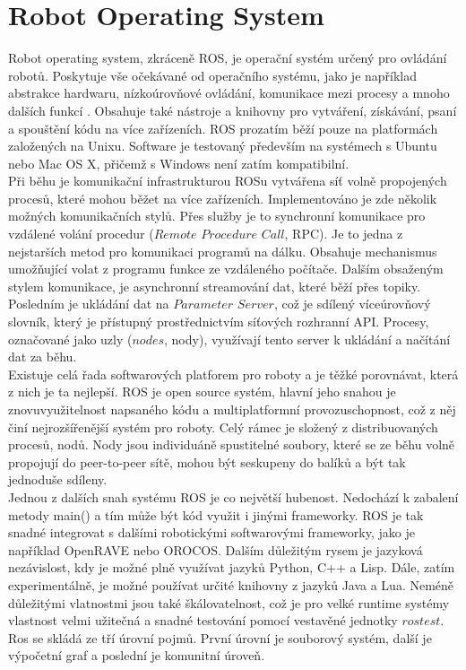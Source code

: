\documentclass[12pt]{report}
\begin{document}
\section{Robot Operating System}
Robot operating system, zkráceně ROS, je operační systém určený pro ovládání robotů. Poskytuje vše očekávané od operačního systému, jako je například abstrakce hardwaru, nízkoúrovňové ovládání, komunikace mezi procesy a mnoho dalších funkcí \cite{Ros}. Obsahuje také nástroje a knihovny pro vytváření, získávání, psaní a spouštění kódu na více zařízeních. ROS prozatím běží pouze na platformách založených na Unixu. Software je testovaný především na systémech s Ubuntu nebo Mac OS X, přičemž s Windows není zatím kompatibilní. \\
\indent Při běhu je komunikační infrastrukturou ROSu vytvářena síť volně propojených procesů, které mohou běžet na více zařízeních. Implementováno je zde několik možných komunikačních stylů. Přes služby je to synchronní komunikace pro vzdálené volání procedur ($Remote$ $Procedure$ $Call$, RPC). Je to jedna z nejstarších metod pro komunikaci programů na dálku. Obsahuje mechanismus umožňující volat z programu funkce ze vzdáleného počítače. Dalším obsaženým stylem komunikace, je asynchronní streamování dat, které běží přes topiky. Posledním je ukládání dat na $Parameter$ $Server$, což je sdílený víceúrovňový slovník, který je přístupný prostřednictvím síťových rozhranní API. Procesy, označované jako uzly ($nodes$, nody), využívají tento server k ukládání a načítání dat za běhu.\\
\indent Existuje celá řada softwarových platforem pro roboty a je těžké porovnávat, která z nich je ta nejlepší. ROS je open source systém, hlavní jeho snahou je znovuvyužitelnost napsaného kódu a multiplatformní provozuschopnost, což z něj činí nejrozšířenější systém pro roboty. Celý rámec je složený z distribuovaných procesů, nodů. Nody jsou individuáně spustitelné soubory, které se ze běhu volně propojují do peer-to-peer sítě, mohou být seskupeny do balíků a být tak jednoduše sdíleny.\\
\indent Jednou z dalších snah systému ROS je co největší hubenost. Nedochází k zabalení metody main() a tím může být kód využit i jinými frameworky. ROS je tak snadné integrovat s dalšími robotickými softwarovými frameworky, jako je například OpenRAVE nebo OROCOS. Dalším důležitým rysem je jazyková nezávislost, kdy je možné plně využívat jazyků Python, C++ a Lisp. Dále, zatím experimentálně, je možné používat určité knihovny z jazyků Java a Lua. Neméně důležitými vlatnostmi jsou také škálovatelnost, což je pro velké runtime systémy vlastnost velmi užitečná a snadné testování pomocí vestavěné jednotky $rostest$.\\
\indent Ros se skládá ze tří úrovní pojmů. První úrovní je souborový systém, další je výpočetní graf a poslední je komunitní úroveň.\\
\end{document}
